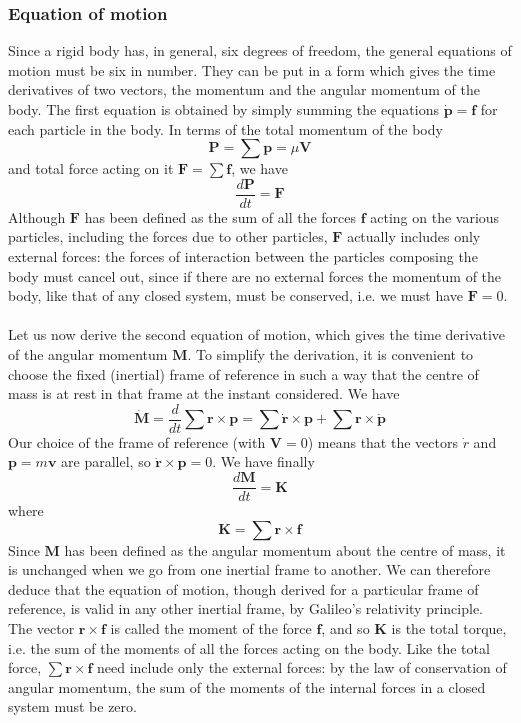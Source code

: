 \documentclass[cyan]{elegantnote}
\begin{document}
\subsubsection{Equation of motion}
Since a rigid body has, in general, six degrees of freedom, the general equations of motion must be six in number. They can be put in a form which gives the time derivatives of two vectors, the momentum and the angular momentum of the body.
The first equation is obtained by simply summing the equations $\dot{\bm{p}} = \bm{f}$ for each particle in the body. In terms of the total momentum of the body
\[\bm{P} = \sum \bm{p} = \mu\bm{V}\]
and total force acting on it $\bm{F} = \sum \bm{f}$, we have
\[\frac{d\bm{P}}{dt} = \bm{F}\]
Although $\bm{F}$ has been defined as the sum of all the forces $\bm{f}$ acting on the various particles, including the forces due to other particles, $\bm{F}$ actually includes only external forces: the forces of interaction between the particles composing the body must cancel out, since if there are no external forces the momentum of the body, like that of any closed system, must be conserved, i.e. we must have $\bm{F} = 0$. \\ \\
Let us now derive the second equation of motion, which gives the time derivative of the angular momentum $\bm{M}$. 
To simplify the derivation, it is convenient to choose the fixed (inertial) frame of reference in such a way that the centre of mass is at rest in that frame at the instant considered. We have
\[\dot{\bm{M}} = \frac{d}{dt} \sum \bm{r} \times \bm{p} = \sum \bm{\dot{r}} \times \bm{p} + \sum \bm{r} \times \dot{\bm{p}}\]
Our choice of the frame of reference (with $\bm{V} = 0$) means that the vectors $\dot{r}$ and $\bm{p} = m\bm{v}$ are parallel, so $\dot{\bm{r}} \times \bm{p} = 0$. We have finally
\[\frac{d\bm{M}}{dt} = \bm{K}\]
where
\[\bm{K} = \sum \bm{r} \times \bm{f}\]
Since $\bm{M}$ has been defined as the angular momentum about the centre of mass, it is unchanged when we go from one inertial frame to another. We can therefore deduce that the equation of motion, though derived for a particular frame of reference, is valid in any other inertial frame, by Galileo's relativity principle.\\
The vector $\bm{r}\times \bm{f}$ is called the moment of the force $\bm{f}$, and so $\bm{K}$ is the total torque, i.e. the sum of the moments of all the forces acting on the body. Like the total force, $\sum \bm{r} \times \bm{f}$ need include only the external forces: by the law of conservation of angular momentum, the sum of the moments of the internal forces in a closed system must be zero.
\end{document}
